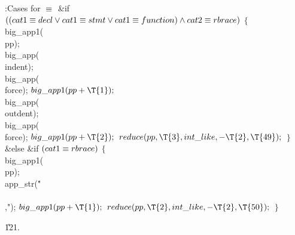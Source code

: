 \B{}:Cases for \X${}\equiv{}$\6
\&{if} ${}((\\{cat1}\E\\{decl}\V\\{cat1}\E\\{stmt}\V\\{cat1}\E\\{function})\W%
\\{cat2}\E\\{rbrace}){}$\5
${}\{{}$\1\6
\\{big\_app1}(\\{pp});\6
\\{big\_app}(\\{indent});\6
\\{big\_app}(\\{force});\6
${}\\{big\_app1}(\\{pp}+\T{1});{}$\6
\\{big\_app}(\\{outdent});\6
\\{big\_app}(\\{force});\6
${}\\{big\_app1}(\\{pp}+\T{2});{}$\6
${}\\{reduce}(\\{pp},\39\T{3},\39\\{int\_like},\39{-}\T{2},\39\T{49});{}$\6
\4${}\}{}$\2\6
\&{else} \&{if} ${}(\\{cat1}\equiv\\{rbrace}){}$\5
${}\{{}$\1\6
\\{big\_app1}(\\{pp});\6
\\{app\_str}(\.{"\\\\,"});\6
${}\\{big\_app1}(\\{pp}+\T{1});{}$\6
${}\\{reduce}(\\{pp},\39\T{2},\39\\{int\_like},\39{-}\T{2},\39\T{50});{}$\6
\4${}\}{}$\2\par
\U121.\fi

